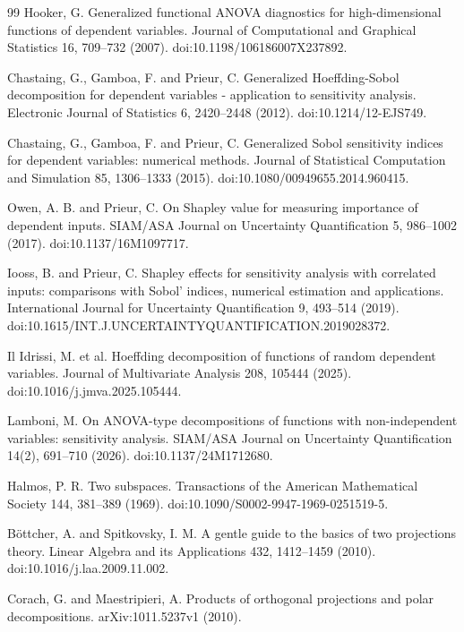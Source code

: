 \documentclass[11pt]{article}
\theoremstyle{remark}
\begin{document}
\begin{thebibliography}{99}
Hooker, G. Generalized functional ANOVA diagnostics for high-dimensional functions of dependent variables. Journal of Computational and Graphical Statistics 16, 709--732 (2007). doi:10.1198/106186007X237892.

Chastaing, G., Gamboa, F. and Prieur, C. Generalized Hoeffding-Sobol decomposition for dependent variables - application to sensitivity analysis. Electronic Journal of Statistics 6, 2420--2448 (2012). doi:10.1214/12-EJS749.

Chastaing, G., Gamboa, F. and Prieur, C. Generalized Sobol sensitivity indices for dependent variables: numerical methods. Journal of Statistical Computation and Simulation 85, 1306--1333 (2015). doi:10.1080/00949655.2014.960415.

Owen, A. B. and Prieur, C. On Shapley value for measuring importance of dependent inputs. SIAM/ASA Journal on Uncertainty Quantification 5, 986--1002 (2017). doi:10.1137/16M1097717.

Iooss, B. and Prieur, C. Shapley effects for sensitivity analysis with correlated inputs: comparisons with Sobol' indices, numerical estimation and applications. International Journal for Uncertainty Quantification 9, 493--514 (2019). doi:10.1615/INT.J.UNCERTAINTYQUANTIFICATION.2019028372.

Il Idrissi, M. et al. Hoeffding decomposition of functions of random dependent variables. Journal of Multivariate Analysis 208, 105444 (2025). doi:10.1016/j.jmva.2025.105444.

Lamboni, M. On ANOVA-type decompositions of functions with non-independent variables: sensitivity analysis. SIAM/ASA Journal on Uncertainty Quantification 14(2), 691--710 (2026). doi:10.1137/24M1712680.

Halmos, P. R. Two subspaces. Transactions of the American Mathematical Society 144, 381--389 (1969). doi:10.1090/S0002-9947-1969-0251519-5.

B\"ottcher, A. and Spitkovsky, I. M. A gentle guide to the basics of two projections theory. Linear Algebra and its Applications 432, 1412--1459 (2010). doi:10.1016/j.laa.2009.11.002.

Corach, G. and Maestripieri, A. Products of orthogonal projections and polar decompositions. arXiv:1011.5237v1 (2010).
\end{thebibliography}
\end{document}
